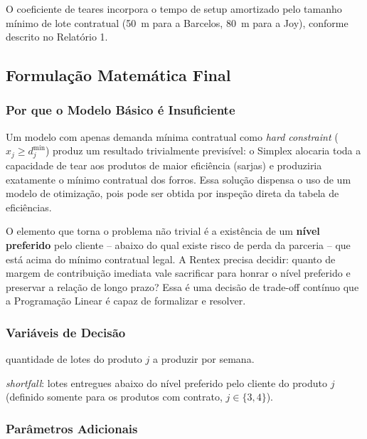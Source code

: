 O coeficiente de teares incorpora o tempo de setup amortizado pelo tamanho mínimo
de lote contratual (50~m para a Barcelos, 80~m para a Joy), conforme descrito
no Relatório 1.

\newpage

\subsection{Formulação Matemática Final}
\label{sec:form_final}

\subsubsection{Por que o Modelo Básico é Insuficiente}

Um modelo com apenas demanda mínima contratual como \textit{hard constraint}
($x_j \geq d_j^{\min}$) produz um resultado trivialmente previsível: o Simplex
alocaria toda a capacidade de tear aos produtos de maior eficiência (sarjas) e
produziria exatamente o mínimo contratual dos forros. Essa solução dispensa o uso
de um modelo de otimização, pois pode ser obtida por inspeção direta da tabela de
eficiências.

O elemento que torna o problema não trivial é a existência de um \textbf{nível
preferido} pelo cliente -- abaixo do qual existe risco de perda da parceria --
que está acima do mínimo contratual legal. A Rentex precisa decidir: quanto de
margem de contribuição imediata vale sacrificar para honrar o nível preferido e
preservar a relação de longo prazo? Essa é uma decisão de trade-off contínuo
que a Programação Linear é capaz de formalizar e resolver.

\subsubsection{Variáveis de Decisão}

\begin{description}[leftmargin=3cm]
  \item[$x_j \geq 0$] quantidade de lotes do produto $j$ a produzir por semana.
  \item[$s_j^- \geq 0$] \textit{shortfall}: lotes entregues abaixo do nível preferido
        pelo cliente do produto $j$ (definido somente para os produtos com contrato,
        $j \in \{3, 4\}$).
\end{description}

\subsubsection{Parâmetros Adicionais}

